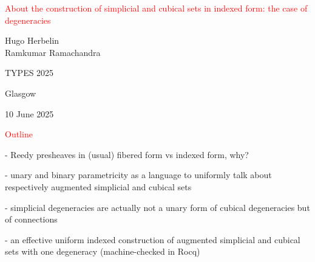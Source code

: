 \documentclass[12pt,landscape]{article}
\begin{document}
\begin{Large}
\begin{sf}

\mbox{}
\vspace{3cm}

\begin{center}

\textcolor{red}{\Huge About the construction of simplicial and cubical
  sets in indexed form: the case of degeneracies}

\medskip
\bigskip
\bigskip
{\Large Hugo Herbelin} \\
\bigskip
{\Large Ramkumar Ramachandra}

\bigskip
\bigskip
\bigskip
\bigskip
\bigskip
\bigskip
\bigskip
TYPES 2025

\bigskip
\bigskip
Glasgow
\bigskip

10 June 2025

\bigskip
\bigskip

\end{center}


\newpage

\begin{center}
\textcolor{red}{\huge Outline}
\end{center}

\bigskip
\noindent - Reedy presheaves in (usual) fibered form vs indexed form, why?
\bigskip

\noindent - unary and binary parametricity as a language to uniformly talk about respectively augmented simplicial and cubical sets
\bigskip

\noindent - simplicial degeneracies are actually not a unary form of cubical
degeneracies but of connections
\bigskip

\noindent - an effective uniform indexed construction of augmented simplicial and cubical sets with one degeneracy (machine-checked in Rocq)




\newcommand{\mysem}[1]{\llbracket #1 \rrbracket}
\newcommand{\deppsh}[2]{\mathsf{DepPresheaf}(#1,#2)}
\newcommand{\HSet}{\mathsf{HSet}}


\end{sf}
\end{Large}
\end{document}
